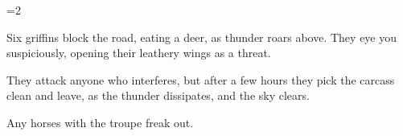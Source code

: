 \ifnum\value{cycle}=2


\begin{boxtext}
  Six \glspl{griffin} block the road, eating a deer, as thunder roars above.
  They eye you suspiciously, opening their leathery wings as a threat.
\end{boxtext}

They attack anyone who interferes, but after a few hours they pick the carcass clean and leave, as the thunder dissipates, and the sky clears.

Any horses with the troupe freak out.

\fi
